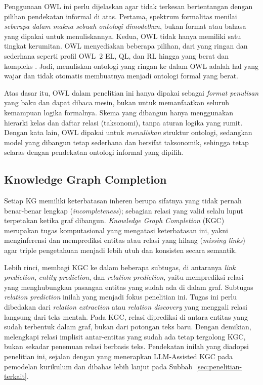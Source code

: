 \documentclass[../../thesis]{subfiles}
\begin{document}
Penggunaan OWL ini perlu dijelaskan agar tidak terkesan bertentangan dengan
pilihan pendekatan informal di atas. Pertama, spektrum formalitas
\textcite{uschold_ontologies_2004} menilai \emph{seberapa dalam makna sebuah
ontologi dimodelkan}, bukan format atau bahasa yang dipakai untuk menuliskannya.
Kedua, OWL tidak hanya memiliki satu tingkat kerumitan. OWL menyediakan beberapa
pilihan, dari yang ringan dan sederhana seperti profil OWL~2 EL, QL, dan RL
hingga yang berat dan kompleks \parencite{w3c_owl2_profiles_2012}. Jadi,
menuliskan ontologi yang ringan ke dalam OWL adalah hal yang wajar dan tidak
otomatis membuatnya menjadi ontologi formal yang berat.

Atas dasar itu, OWL dalam penelitian ini hanya dipakai sebagai \emph{format
penulisan} yang baku dan dapat dibaca mesin, bukan untuk memanfaatkan seluruh
kemampuan logika formalnya. Skema yang dibangun hanya menggunakan hierarki
kelas dan daftar relasi (taksonomi), tanpa aturan logika yang rumit. Dengan
kata lain, OWL dipakai untuk \emph{menuliskan} struktur ontologi, sedangkan
model yang dibangun tetap sederhana dan bersifat taksonomik, sehingga tetap
selaras dengan pendekatan ontologi informal yang dipilih.

\subsection{Knowledge Graph Completion}
\label{subsec:kgc}

Setiap KG memiliki keterbatasan inheren berupa sifatnya yang tidak pernah
benar-benar lengkap (\textit{incompleteness}); sebagian relasi yang valid
selalu luput terpetakan ketika graf dibangun. \textit{Knowledge Graph
Completion} (KGC) merupakan tugas komputasional yang mengatasi keterbatasan
ini, yakni menginferensi dan memprediksi entitas atau relasi yang hilang
(\textit{missing links}) agar triple pengetahuan menjadi lebih utuh dan
konsisten secara semantik.

Lebih rinci, \textcite{ji_survey_2022} membagi KGC ke dalam beberapa subtugas, di
antaranya \textit{link prediction}, \textit{entity prediction}, dan
\textit{relation prediction}, yaitu memprediksi relasi yang menghubungkan
pasangan entitas yang sudah ada di dalam graf. Subtugas \textit{relation
prediction} inilah yang menjadi fokus penelitian ini. Tugas ini perlu dibedakan
dari \textit{relation extraction} atau \textit{relation discovery} yang menggali
relasi langsung dari teks mentah. Pada KGC, relasi diprediksi di antara entitas
yang sudah terbentuk dalam graf, bukan dari potongan teks baru. Dengan demikian,
melengkapi relasi implisit antar-entitas yang sudah ada tetap tergolong KGC,
bukan sekadar penemuan relasi berbasis teks. Pendekatan inilah yang diadopsi
penelitian ini, sejalan dengan \textcite{abu-rasheed_llm-assisted_2025} yang
menerapkan LLM-Assisted KGC pada pemodelan kurikulum dan dibahas lebih lanjut
pada Subbab~\ref{sec:penelitian-terkait}.
\end{document}
